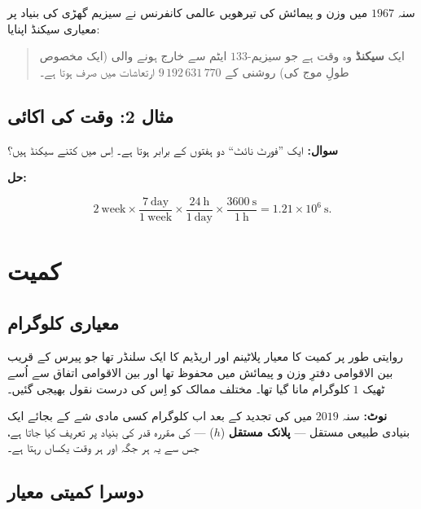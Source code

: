 \documentclass{urdu-textbook}
\begin{document}
سنہ \(1967\) میں وزن و پیمائش کی تیرھویں عالمی کانفرنس نے سیزیم گھڑی کی
بنیاد پر معیاری سیکنڈ اپنایا:

\begin{quote}
ایک \textbf{سیکنڈ} وہ وقت ہے جو سیزیم-\(133\) ایٹم سے خارج ہونے والی
(ایک مخصوص طولِ موج کی) روشنی کے \(9\,192\,631\,770\) ارتعاشات میں صرف
ہوتا ہے۔
\end{quote}

\hypertarget{ux645ux62bux627ux644-2-ux648ux642ux62a-ux6a9ux6cc-ux627ux6a9ux627ux626ux6cc}{%
\subsection{مثال 2: وقت کی
اکائی}\label{ux645ux62bux627ux644-2-ux648ux642ux62a-ux6a9ux6cc-ux627ux6a9ux627ux626ux6cc}}

\textbf{سوال:} ایک ”فورٹ نائٹ“  دو ہفتوں کے برابر ہوتا ہے۔
اِس میں کتنے سیکنڈ ہیں؟

\textbf{حل:}

\[2\ \mathrm{week}\times\frac{7\ \mathrm{day}}{1\ \mathrm{week}}\times\frac{24\ \mathrm{h}}{1\ \mathrm{day}}\times\frac{3600\ \mathrm{s}}{1\ \mathrm{h}} = 1.21\times10^{6}\ \mathrm{s}.\]

\hypertarget{ux6a9ux645ux6ccux62a}{%
\section{کمیت}\label{ux6a9ux645ux6ccux62a}}

\hypertarget{ux645ux639ux6ccux627ux631ux6cc-ux6a9ux644ux648ux6afux631ux627ux645}{%
\subsection{معیاری
کلوگرام}\label{ux645ux639ux6ccux627ux631ux6cc-ux6a9ux644ux648ux6afux631ux627ux645}}

روایتی طور پر کمیت کا  معیار پلاٹینم اور اریڈیم کا ایک سلنڈر تھا جو
پیرس کے قریب بین الاقوامی دفترِ وزن و پیمائش میں محفوظ تھا اور بین
الاقوامی اتفاق سے اُسے ٹھیک \(1\) کلوگرام مانا گیا تھا۔ مختلف ممالک کو اِس
کی درست نقول بھیجی گئیں۔

\textbf{نوٹ:} سنہ \(2019\) میں  کی تجدید کے بعد اب کلوگرام کسی مادی شے
کے بجائے ایک بنیادی طبیعی مستقل --- \textbf{پلانک مستقل} (\(h\)) --- کی
مقررہ قدر کی بنیاد پر تعریف کیا جاتا ہے، جس سے یہ ہر جگہ اور ہر وقت
یکساں رہتا ہے۔

\hypertarget{ux62fux648ux633ux631ux627-ux6a9ux645ux6ccux62aux6cc-ux645ux639ux6ccux627ux631}{%
\subsection{دوسرا کمیتی
معیار}\label{ux62fux648ux633ux631ux627-ux6a9ux645ux6ccux62aux6cc-ux645ux639ux6ccux627ux631}}
\end{document}
